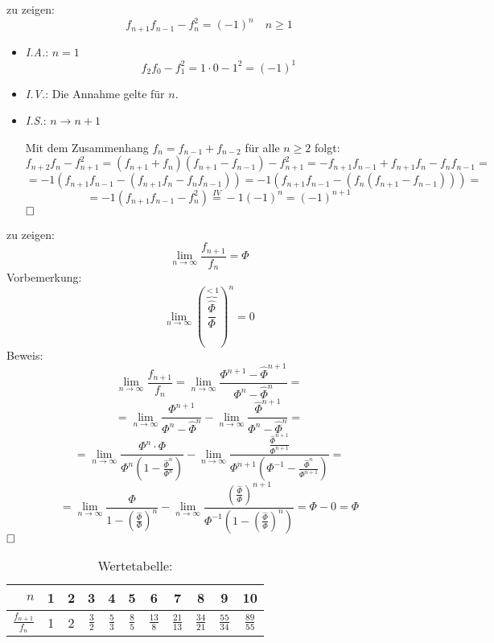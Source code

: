 \begin{flushenum}
\item
zu zeigen:
  \[ f_{n+1} f_{n-1} - f_n^2 = (-1)^n \quad n \geq 1 \]
  \begin{itemize}
    \item \textit{I.A.}: $n = 1$
      \[ f_2f_0 - f_1^2 = 1 \cdot 0 - 1^2 = (-1)^1 \]
    \item \textit{I.V.}: Die Annahme gelte für $n$.
    \item \textit{I.S.}: $n \rightarrow n + 1$

    Mit dem Zusammenhang $f_{n} = f_{n-1} + f_{n-2}$ für alle $n \geq 2$ folgt:
    \[ f_{n+2}f_n - f_{n+1}^2 = (f_{n+1} + f_n)(f_{n+1} - f_{n-1}) - f_{n+1}^2
                              = -f_{n+1}f_{n-1} + f_{n+1}f_n - f_nf_{n-1} = \]
    \[ = -1(f_{n+1}f_{n-1} - (f_{n+1}f_n - f_nf_{n-1})) 
       = -1(f_{n+1}f_{n-1} - (f_n(f_{n+1} - f_{n-1}))) = \]
    \[ = -1(f_{n+1}f_{n-1} - f_n^2) \overset{IV}{=} -1(-1)^n = (-1)^{n+1} \]
    $\hfill \square$
  \end{itemize}
\item
  zu zeigen:
  \[ \lim_{n \rightarrow \infty} \frac{f_{n+1}}{f_n} = \Phi \]
  Vorbemerkung:
  \[ \lim_{n \rightarrow \infty} (\overbrace{\frac{\widehat \Phi}{\Phi}}^{< 1})^n = 0 \]
  Beweis:
  \[ \lim_{n \rightarrow \infty} \frac{f_{n+1}}{f_n} 
     = \lim_{n \rightarrow \infty} \frac{\Phi^{n+1} - 
       \widehat \Phi^{n+1}}{\Phi^n - \widehat \Phi^n} = \]
  \[ = \lim_{n \rightarrow \infty} \frac{\Phi^{n+1}}{\Phi^n - \widehat \Phi^n} - 
       \lim_{n \rightarrow \infty} \frac{\widehat \Phi^{n+1}}{\Phi^n - \widehat \Phi^n} = \]
  \[ = \lim_{n \rightarrow \infty} \frac{\Phi^n \cdot \Phi}{\Phi^n (1 - \frac{\widehat \Phi^n}{\Phi^n})} - 
       \lim_{n \rightarrow \infty} \frac{\frac{\widehat \Phi^{n+1}}{\Phi^{n+1}}}
                                        {\Phi^{n+1}(\Phi^{-1} - \frac{\widehat \Phi^n}{\Phi^{n+1}})} = \]
  \[ = \lim_{n \rightarrow \infty} \frac{\Phi}{1 - (\frac{\widehat \Phi}{\Phi})^n} - 
       \lim_{n \rightarrow \infty} \frac{(\frac{\widehat \Phi}{\Phi})^{n+1}}
                                        {\Phi^{-1} (1 - (\frac{\widehat \Phi}{\Phi})^n)} 
     = \Phi - 0 = \Phi \] $\hfill \square$
  \begin{table}[h!b!p!]
  \caption{Wertetabelle:}
  \begin{center}
  \begin{tabular}{r|cccccccccc}
  $n$                   & 1  &  2  &  3  &  4  &  5  &  6  &  7  &  8  &  9  & 10 \\
  \hline
  $\frac{f_{n+1}}{f_n}$ & 1  &  2  & $\frac{3}{2}$ & $\frac{5}{3}$ & $\frac{8}{5}$ & $\frac{13}{8}$ & $\frac{21}{13}$ & $\frac{34}{21}$ & $\frac{55}{34}$ & $\frac{89}{55}$
  \end{tabular}
  \end{center}
  \end{table}


\end{flushenum}
